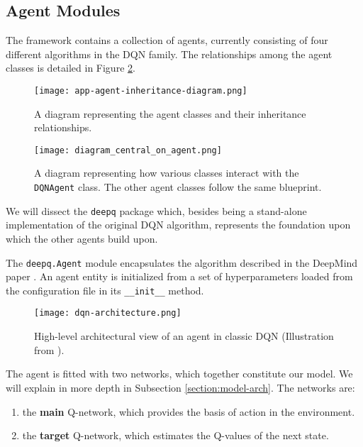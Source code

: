\subsection{Agent Modules} \label{section:agent-modules}

The framework contains a collection of agents, currently consisting of four different algorithms in the DQN family.
The relationships among the agent classes is detailed in Figure \ref{fig:agent-class-diagram}.

\begin{figure}[h]
    \centering
    \texttt{[image: app-agent-inheritance-diagram.png]}
    \caption{A diagram representing the agent classes and their inheritance relationships.}
    \label{fig:agent-class-diagram}
\end{figure}

\begin{figure}[h]
    \centering
    \texttt{[image: diagram\_central\_on\_agent.png]}
    \caption{A diagram representing how various classes interact with the \texttt{DQNAgent} class.
    The other agent classes follow the same blueprint.
    }
    \label{fig:agent-class-diagram}
\end{figure}

We will dissect the \texttt{deepq} package which, besides being a stand-alone implementation of the original DQN algorithm, represents the foundation upon which the other agents build upon.

The \texttt{deepq.Agent} module encapsulates the algorithm described in the DeepMind paper \cite{atari-dqn}.
An agent entity is initialized from a set of hyperparameters loaded from the configuration file in its \verb|__init__| method.

\begin{figure}
    \centering
    \texttt{[image: dqn-architecture.png]}
    \caption{High-level architectural view of an agent in classic DQN (Illustration from \cite{mpmdrl}).}
    \label{fig:dqn-architecture}
\end{figure}

The agent is fitted with two networks, which together constitute our model. We will explain in more depth in Subsection \ref{section:model-arch}. The networks are:
\begin{enumerate}
    \item the \textbf{main} Q-network, which provides the basis of action in the environment.
    \item the \textbf{target} Q-network, which estimates the Q-values of the next state.
\end{enumerate}

